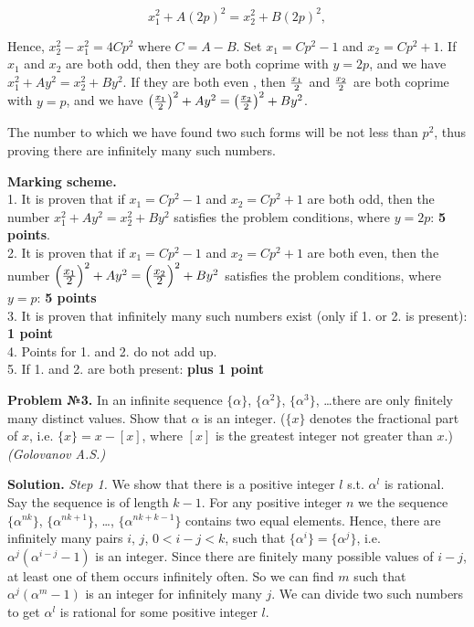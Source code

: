 \documentclass[12pt]{article}
\def\frac#1#2{\mathchoice{#1\over#2}{\hbox{\small$#1$}\over\mathstrut\hbox{\small$#2$}}{#1\over#2}{#1\over#2}}
\newcounter{problem}
\def \Problem#1{\par \bigskip \textbf{Problem №{#1}. }}
\def \solution{\par \bigskip \textbf{Solution. }}
\def \marking{\par \bigskip \textbf{Marking scheme. }}
\begin{document}
$$x_1^2 + A(2p)^2 = x_2^2 + B(2p)^2,$$

Hence, $x_2^2 - x_1^2 = 4Cp^2$ where $C = A - B$. Set $x_1 = Cp^2 - 1$ and $x_2 = Cp^2 + 1$. If $x_1$ and $x_2$ are both odd, then they are both coprime with $y = 2p$, and we have $x_1^2 +  Ay^2 = x_2^2 + By^2$. If they are both even , then $x_1\over 2$ and $x_2 \over 2$ are both coprime with $y = p$, and we have $\left({x_1\over 2}\right)^2+Ay^2=\left({x_2\over 2}\right)^2+By^2$.

The number to which we have found two such forms will be not less than $p^2$, thus proving there are infinitely many such numbers.

\marking
\\ 1. It is proven that if $x_1 = Cp^2 - 1$ and $x_2 = Cp^2 + 1$ are both odd, then the number $x_1^2 + Ay^2 = x_2^2 + By^2$ satisfies the problem conditions, where $y = 2p$: \dotfill \textbf{5 points}.
\\ 2. It is proven that if $x_1 = Cp^2 - 1$ and $x_2 = Cp^2 + 1$ are both even, then the number $\left(\frac{x_1}{2}\right)^2+Ay^2=\left(\frac{x_2}{2}\right)^2+By^2$ satisfies the problem conditions, where $y = p$: \dotfill \textbf{5 points}
\\ 3. It is proven that infinitely many such numbers exist (only if 1. or 2. is present): \dotfill \textbf{1 point}
\\ 4. Points for 1. and 2. do not add up.
\\ 5. If 1. and 2. are both present: \dotfill \textbf{plus 1 point}

\Problem{3} 
In an infinite sequence $\{\alpha\}$, $\{\alpha^2\}$, $\{\alpha^3\}$, \dots there are only finitely many distinct values. Show that $\alpha$ is an integer. ($\{x\}$ denotes the fractional part of $x$, i.e. $\{x\} = x - [ x ]$, where $[ x ]$ is the greatest integer not greater than $x$.) \textit{(Golovanov A.S.)}

\solution 
\textit{Step 1.} We show that there is a positive integer $l$ s.t. $\alpha^l$ is rational. Say the sequence is of length $k-1$. For any positive integer $n$ we the sequence $\{\alpha^{nk}\}$, 
$\{\alpha^{nk+1}\}$, \dots, $\{\alpha^{nk+k-1}\}$ contains two equal elements. Hence, there are infinitely many pairs $i$, $j$,
$0<i-j<k$, such that $\{\alpha^i\}=\{\alpha^j\}$, i.e. $\alpha^j(\alpha^{i-j}-1)$ is an integer. Since there are finitely many possible values of $i-j$, at least one of them occurs infinitely often. So we can find $m$ such that $\alpha^j(\alpha^m-1)$ is an integer for infinitely many $j$. We can divide two such numbers to get $\alpha^l$ is rational for some positive integer $l$.
\end{document}
